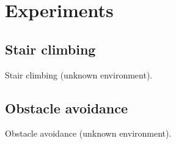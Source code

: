 \chapter{Experiments}
\section{Stair climbing}
Stair climbing (unknown environment).

\section{Obstacle avoidance}
Obstacle avoidance (unknown environment).

